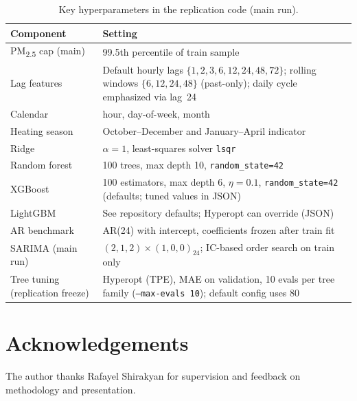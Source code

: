\documentclass[11pt,a4paper]{article}
\begin{document}
\begin{table}[h]
\centering
\small
\caption{Key hyperparameters in the replication code (main run).}
\label{tab:hyper}
\begin{tabular}{p{}p{}}
\toprule
Component & Setting \\
\midrule
PM\textsubscript{2.5} cap (main) & 99.5th percentile of train sample \\
Lag features & Default hourly lags $\{1,2,3,6,12,24,48,72\}$; rolling windows $\{6,12,24,48\}$ (past-only); daily cycle emphasized via lag~24 \\
Calendar & hour, day-of-week, month \\
Heating season & October--December and January--April indicator \\
Ridge & $\alpha = 1$, least-squares solver \texttt{lsqr} \\
Random forest & 100 trees, max depth 10, \texttt{random\_state=42} \\
XGBoost & 100 estimators, max depth 6, $\eta=0.1$, \texttt{random\_state=42} (defaults; tuned values in JSON) \\
LightGBM & See repository defaults; Hyperopt can override (JSON) \\
AR benchmark & AR(24) with intercept, coefficients frozen after train fit \\
SARIMA (main run) & $(2,1,2)\times(1,0,0)_{24}$; IC-based order search on train only \\
Tree tuning (replication freeze) & Hyperopt (TPE), MAE on validation, 10 evals per tree family (\texttt{--max-evals 10}); default config uses 80 \\
\bottomrule
\end{tabular}
\end{table}

\section*{Acknowledgements}

The author thanks Rafayel Shirakyan for supervision and feedback on methodology and presentation.



\end{document}
